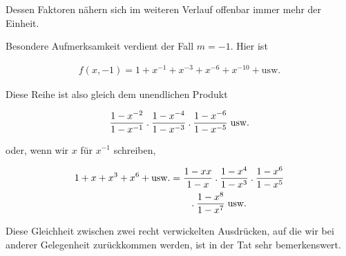 Dessen Faktoren nähern sich im weiteren Verlauf offenbar immer mehr der Einheit.

Besondere Aufmerksamkeit verdient der Fall $m=-1$. Hier ist

\[
\begin{aligned}
f(x,-1)=1+x^{-1}+x^{-3}+x^{-6}+x^{-10}+\text{usw.}
\end{aligned}
\]

Diese Reihe ist also gleich dem unendlichen Produkt

\[
\begin{aligned}
\frac{1-x^{-2}}{1-x^{-1}}\mathbin{.}\frac{1-x^{-4}}{1-x^{-3}}\mathbin{.}\frac{1-x^{-6}}{1-x^{-5}}\;\text{usw.}
\end{aligned}
\]

oder, wenn wir $x$ für $x^{-1}$ schreiben,

\[
\begin{aligned}
1+x+x^3+x^6+\text{usw.}&=\frac{1-xx}{1-x}\mathbin{.}\frac{1-x^4}{1-x^3}\mathbin{.}\frac{1-x^6}{1-x^5}\\
&\qquad\mathbin{.}\frac{1-x^8}{1-x^7}\;\text{usw.}
\end{aligned}
\]

Diese Gleichheit zwischen zwei recht verwickelten Ausdrücken, auf die wir bei anderer Gelegenheit zurückkommen werden, ist in der Tat sehr bemerkenswert.
